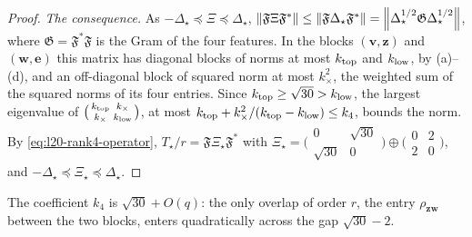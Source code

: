 \begin{proof}
\emph{The consequence.} As $-\Delta_\star\preceq\Xi\preceq\Delta_\star$,
$\left\|\mathfrak F\Xi\mathfrak F^*\right\|\le\left\|\mathfrak F\Delta_\star\mathfrak F^*\right\|
=\left\|\Delta_\star^{1/2}\mathfrak G\Delta_\star^{1/2}\right\|$, where
$\mathfrak G=\mathfrak F^*\mathfrak F$ is the Gram of the four features. In the
blocks $(\mathbf v,\mathbf z)$ and $(\mathbf w,\mathbf e)$ this matrix has
diagonal blocks of norms at most $k_{\rm top}$ and $k_{\rm low}$, by (a)--(d),
and an off-diagonal block of squared norm at most $k_\times^2$, the weighted sum
of the squared norms of its four entries. Since
$k_{\rm top}\ge\sqrt{30}>k_{\rm low}$, the largest eigenvalue of
$\bigl(\begin{smallmatrix}k_{\rm top}&k_\times\\k_\times&k_{\rm low}\end{smallmatrix}\bigr)$,
at most $k_{\rm top}+k_\times^2/(k_{\rm top}-k_{\rm low})\le k_4$, bounds the
norm. By \eqref{eq:l20-rank4-operator}, $T_\star/r=\mathfrak F\Xi_\star\mathfrak F^*$
with $\Xi_\star=\bigl(\begin{smallmatrix}0&\sqrt{30}\\\sqrt{30}&0\end{smallmatrix}\bigr)
\oplus\bigl(\begin{smallmatrix}0&2\\2&0\end{smallmatrix}\bigr)$, and
$-\Delta_\star\preceq\Xi_\star\preceq\Delta_\star$.
\end{proof}

The coefficient $k_4$ is $\sqrt{30}+O(q)$: the only overlap of order $r$, the
entry $\rho_{\mathbf z\mathbf w}$ between the two blocks, enters quadratically
across the gap $\sqrt{30}-2$.


